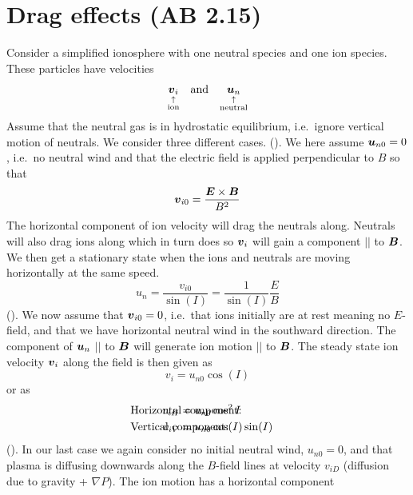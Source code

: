 \section[Drag effects]{Drag effects (AB 2.15)}
Consider a simplified ionosphere with one neutral species and one ion species. These particles have velocities
\begin{equation*}
    \underset{\substack{\uparrow \\ \textnormal{ion}}}{\boldsymbol{v}_i}\quad\textnormal{and}\quad\underset{\substack{\uparrow \\\textnormal{neutral}}}{\boldsymbol{u}_n}
\end{equation*}
Assume that the neutral gas is in hydrostatic equilibrium, i.e.\ ignore vertical motion of neutrals. We consider three different cases.  (). We here assume \(\boldsymbol{u}_{n0}=0\), i.e.\ no neutral wind and that the electric field is applied perpendicular to \(B\) so that
\begin{equation*}
    \boldsymbol{v}_{i0}=\frac{\boldsymbol{E}\times\boldsymbol{B}}{B^2}
\end{equation*}
The horizontal component of ion velocity will drag the neutrals along. Neutrals will also drag ions along which in turn does so \(\boldsymbol{v}_i\) will gain a component \(\vert\vert \) to \(\boldsymbol{B}\). We then get a stationary state when the ions and neutrals are moving horizontally at the same speed.
\begin{equation*}
    u_n=\frac{v_{i0}}{\sin(I)}=\frac{1}{\sin(I)}\frac{E}{B}
\end{equation*}
 (). We now assume that \(\boldsymbol{v}_{i0}=0\), i.e.\ that ions initially are at rest meaning no \(E\)-field, and that we have horizontal neutral wind in the southward direction. The component of \(\boldsymbol{u}_n\) \(\vert\vert \) to \(\boldsymbol{B}\) will generate ion motion \(\vert\vert \) to \(\boldsymbol{B}\). The steady state ion velocity \(\boldsymbol{v}_i\) along the field is then given as
\begin{equation*}
    v_i=u_{n0}\cos(I)
\end{equation*}
or as
\begin{align*}
    &\tn{Horizontal component: } \hspace{-3cm}&v_{iH}&=u_{n0}\cos^2I&\\
    &\tn{Vertical component: } \hspace{-3cm}&v_{iV}&=u_{n0}\cos(I)\sin(I)&
\end{align*}
 (). In our last case we again consider no initial neutral wind, \(u_{n0}=0\), and that plasma is diffusing downwards along the \(B\)-field lines at velocity \(v_{iD}\) (diffusion due to gravity + \(\nabla P\)). The ion motion has a horizontal component
